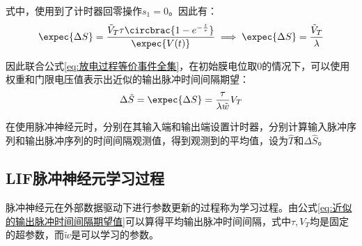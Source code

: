 \documentclass[11pt]{article}
\begin{document}
式中，使用到了计时器回零操作$s_1=0$。因此有：
\begin{align*}
  \expec{\Delta S} =\frac{\tilde{V}_T\tau\circbrac{1-e^{-\frac{t}{\tau}}}}{\expec{V(t)}}\implies \expec{\Delta S}=\frac{\tilde{V}_T}{\lambda}
\end{align*}\par
因此联合公式\ref{eq:放电过程等价事件全集}，在初始膜电位取0的情况下，可以使用权重和门限电压值表示出近似的输出脉冲时间间隔期望：
\begin{align}
  \Delta\tilde{S}=\expec{\Delta S}=\frac{\tau}{\lambda\tilde{w}}V_T
  \label{eq:近似的输出脉冲时间间隔期望值}
\end{align}\par
在使用脉冲神经元时，分别在其输入端和输出端设置计时器，分别计算输入脉冲序列和输出脉冲序列的时间间隔观测值，得到观测到的平均值，设为$\hat{T}$和$\Delta\hat{S}$。
\subsection{LIF脉冲神经元学习过程}
脉冲神经元在外部数据驱动下进行参数更新的过程称为学习过程。由公式\ref{eq:近似的输出脉冲时间间隔期望值}可以算得平均输出脉冲时间间隔，式中$\tau,V_T$均是固定的超参数，而$\tilde{w}$是可以学习的参数。
\end{document}
